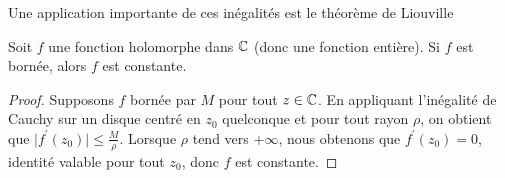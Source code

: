 Une application importante de ces inégalités est le théorème de Liouville
\begin{theorem}[Liouville]
Soit $f$ une fonction holomorphe dans $\mathbb{C}$ (donc une fonction entière). Si $f$ est bornée, alors $f$ est constante.
\end{theorem}
\begin{proof}
Supposons $f$ bornée par $M$ pour tout $z \in \mathbb{C}$. En appliquant l'inégalité de Cauchy sur un disque centré en $z_0$ quelconque et pour tout rayon $\rho$, on obtient que $\lvert f^\prime(z_0)\rvert \leq \frac{M}{\rho}$.
Lorsque $\rho$ tend vers $+\infty$, nous obtenons que $f^\prime(z_0)=0$, identité valable pour tout $z_0$, donc $f$ est constante.
\end{proof}
